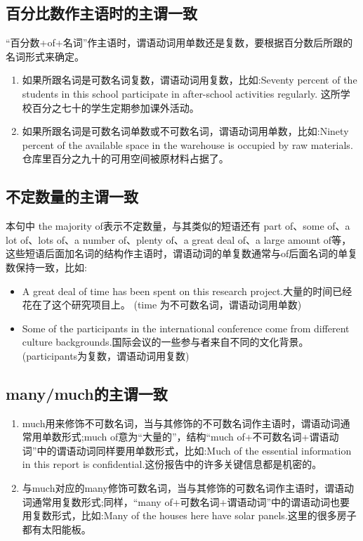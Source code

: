 \subsection{百分比数作主语时的主谓一致}

“百分数+of+名词”作主语时，谓语动词用单数还是复数，要根据百分数后所跟的名词形式来确定。
\begin{enumerate}
  \item 如果所跟名词是可数名词复数，谓语动词用复数，比如:Seventy percent of the students in this school participate in after-school activities regularly. 这所学校百分之七十的学生定期参加课外活动。
  \item 如果所跟名词是可数名词单数或不可数名词，谓语动词用单数，比如:Ninety percent of the available space in the warehouse is occupied by raw materials. 仓库里百分之九十的可用空间被原材料占据了。
\end{enumerate}

\subsection{不定数量的主谓一致}

本句中 the majority of表示不定数量，与其类似的短语还有 part of、some of、a lot of、lots of、a number of、plenty of、a great deal of、a large amount of等，这些短语后面加名词的结构作主语时，谓语动词的单复数通常与of后面名词的单复数保持一致，比如:
\begin{itemize}
  \item A great deal of time has been spent on this research project.大量的时间已经花在了这个研究项目上。 (time 为不可数名词，谓语动词用单数)
  \item Some of the participants in the international conference come from different culture backgrounds.国际会议的一些参与者来自不同的文化背景。 (participants为复数，谓语动词用复数)
\end{itemize}

\subsection{many/much的主谓一致}

\begin{enumerate}
  \item much用来修饰不可数名词，当与其修饰的不可数名词作主语时，谓语动词通常用单数形式;much of意为“大量的”，结构“much of+不可数名词+谓语动词”中的谓语动词同样要用单数形式，比如:Much of the essential information in this report is confidential.这份报告中的许多关键信息都是机密的。
  \item 与much对应的many修饰可数名词，当与其修饰的可数名词作主语时，谓语动词通常用复数形式;同样，“many of+可数名词+谓语动词”中的谓语动词也要用复数形式，比如:Many of the houses here have solar panels.这里的很多房子都有太阳能板。
\end{enumerate}


